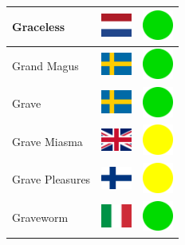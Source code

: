 \documentclass[12pt, a4paper, twoside]{report}
\begin{document}
\begin{center}
\begin{longtable}{|p{5cm}|p{2cm}|p{2cm}|}
 Graceless                                                  & \includegraphics[width=1cm]{../img/flags/nl} &   \includegraphics[width=1cm]{../likes/y} \\ \hline
 Grand Magus                                                & \includegraphics[width=1cm]{../img/flags/se} &   \includegraphics[width=1cm]{../likes/y} \\ \hline
 Grave                                                      & \includegraphics[width=1cm]{../img/flags/se} &   \includegraphics[width=1cm]{../likes/y} \\ \hline
 Grave Miasma                                               & \includegraphics[width=1cm]{../img/flags/gb} &   \includegraphics[width=1cm]{../likes/m} \\ \hline
 Grave Pleasures                                            & \includegraphics[width=1cm]{../img/flags/fi} &   \includegraphics[width=1cm]{../likes/m} \\ \hline
 Graveworm                                                  & \includegraphics[width=1cm]{../img/flags/it} &   \includegraphics[width=1cm]{../likes/y} \\ \hline

\end{longtable}
\end{center}
\end{document}
